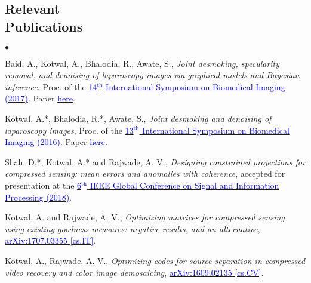 \documentclass[margin,line]{res}
\newenvironment{list2}{
  \begin{list}{$\bullet$}{%
      \setlength{\itemsep}{0in}
      \setlength{\parsep}{0in} \setlength{\parskip}{0in}
      \setlength{\topsep}{0in} \setlength{\partopsep}{0in} 
      \setlength{\leftmargin}{0.18in}}}{\end{list}}
\begin{document}
\begin{resume}
\section{{\sc Relevant \\Publications}}
\begin{list2}
\item Baid, A., Kotwal, A., Bhalodia, R., Awate, S., {\em Joint desmoking, specularity removal, and denoising of laparoscopy images via graphical models and Bayesian inference}. Proc. of the \href{http://biomedicalimaging.org/2017/}{\textcolor{blue} {14$^\text{th}$ International Symposium on Biomedical Imaging (2017)}}. Paper \href{http://ieeexplore.ieee.org/document/7950623/?reload=true}{\textcolor{blue} {here}}.
\item Kotwal, A.*, Bhalodia, R.*, Awate, S., {\em Joint desmoking and denoising of laparoscopy images}, Proc. of the \href{http://biomedicalimaging.org/2016/}{\textcolor{blue} {13$^\text{th}$ International Symposium on Biomedical Imaging (2016)}}. Paper \href{http://ieeexplore.ieee.org/document/7493446/?reload=true}{\textcolor{blue} {here}}.
\item Shah, D.*, Kotwal, A.* and Rajwade, A. V., {\em Designing constrained projections for compressed sensing: mean errors and anomalies with coherence}, accepted for presentation at the \href{https://2018.ieeeglobalsip.org/}{\textcolor{blue}{6$^\text{th}$ IEEE Global Conference on Signal and Information Processing (2018)}}.
\item Kotwal, A. and Rajwade, A. V., {\em Optimizing matrices for compressed sensing using existing goodness measures: negative results, and an alternative}, \href{https://arxiv.org/abs/1707.03355}{\textcolor{blue}{arXiv:1707.03355 [cs.IT]}}.
\item Kotwal, A., Rajwade, A. V., {\em Optimizing codes for source separation in compressed video recovery and color image demosaicing}, \href{https://arxiv.org/abs/1609.02135}{\textcolor{blue} {arXiv:1609.02135 [cs.CV]}}.
\end{list2}

\vspace*{-0.13in}


\end{resume}
\end{document}
